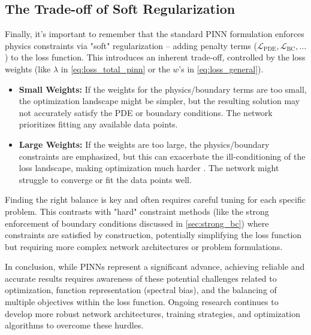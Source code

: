 \subsection{The Trade-off of Soft Regularization}

Finally, it's important to remember that the standard PINN formulation enforces physics constraints via "soft" regularization – adding penalty terms ($\mathcal{L}_{\text{PDE}}, \mathcal{L}_{\text{BC}}, \dots$) to the loss function. This introduces an inherent trade-off, controlled by the loss weights (like $\lambda$ in \cref{eq:loss_total_pinn} or the $w$'s in \cref{eq:loss_general}).

\begin{itemize}
    \item \textbf{Small Weights:} If the weights for the physics/boundary terms are too small, the optimization landscape might be simpler, but the resulting solution may not accurately satisfy the PDE or boundary conditions. The network prioritizes fitting any available data points.
    \item \textbf{Large Weights:} If the weights are too large, the physics/boundary constraints are emphasized, but this can exacerbate the ill-conditioning of the loss landscape, making optimization much harder \cite{krishnapriyan2021characterizing}. The network might struggle to converge or fit the data points well.
\end{itemize}
Finding the right balance is key and often requires careful tuning for each specific problem. This contrasts with "hard" constraint methods (like the strong enforcement of boundary conditions discussed in \cref{sec:strong_bc}) where constraints are satisfied by construction, potentially simplifying the loss function but requiring more complex network architectures or problem formulations.

In conclusion, while PINNs represent a significant advance, achieving reliable and accurate results requires awareness of these potential challenges related to optimization, function representation (spectral bias), and the balancing of multiple objectives within the loss function. Ongoing research continues to develop more robust network architectures, training strategies, and optimization algorithms to overcome these hurdles.


